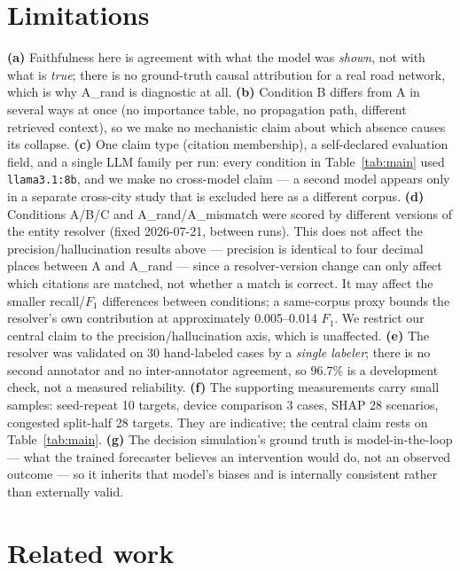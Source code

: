 \documentclass{article}
\begin{document}
\section{Limitations}

\textbf{(a)} Faithfulness here is agreement with what the model was \emph{shown},
not with what is \emph{true}; there is no ground-truth causal attribution for a real
road network, which is why A\_rand is diagnostic at all. \textbf{(b)} Condition B
differs from A in several ways at once (no importance table, no propagation path,
different retrieved context), so we make no mechanistic claim about which absence
causes its collapse. \textbf{(c)} One claim type (citation membership), a
self-declared evaluation field, and a single LLM family per run: every condition in
Table~\ref{tab:main} used \texttt{llama3.1:8b}, and we make no cross-model claim ---
a second model appears only in a separate cross-city study that is excluded here as
a different corpus. \textbf{(d)} Conditions A/B/C and A\_rand/A\_mismatch were
scored by different versions of the entity resolver (fixed 2026-07-21, between
runs). This does not affect the precision/hallucination results above --- precision
is identical to four decimal places between A and A\_rand --- since a
resolver-version change can only affect which citations are matched, not whether a
match is correct. It may affect the smaller recall/$F_1$ differences between
conditions; a same-corpus proxy bounds the resolver's own contribution at
approximately 0.005--0.014 $F_1$. We restrict our central claim to the
precision/hallucination axis, which is unaffected. \textbf{(e)} The resolver was
validated on 30 hand-labeled cases by a \emph{single labeler}; there is no second
annotator and no inter-annotator agreement, so $96.7\%$ is a development check, not
a measured reliability. \textbf{(f)} The supporting measurements carry small samples:
seed-repeat 10 targets, device comparison 3 cases, SHAP 28 scenarios, congested
split-half 28 targets. They are indicative; the central claim rests on
Table~\ref{tab:main}. \textbf{(g)} The decision
simulation's ground truth is model-in-the-loop --- what the trained forecaster
believes an intervention would do, not an observed outcome --- so it inherits that
model's biases and is internally consistent rather than externally valid.

\section{Related work}
\end{document}
